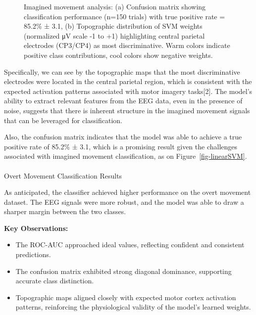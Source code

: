 \documentclass[
  letterpaper,
  DIV=11,
  numbers=noendperiod]{scrartcl}
\makeatletter
\let\oldparagraph\paragraph
\renewcommand{\paragraph}{
    \@ifstar
      \xxxParagraphStar
      \xxxParagraphNoStar
  }
\newcommand{\xxxParagraphStar}[1]{\oldparagraph*{#1}\mbox{}}
\newcommand{\xxxParagraphNoStar}[1]{\oldparagraph{#1}\mbox{}}
\providecommand{\tightlist}{%
  \setlength{\itemsep}{0pt}\setlength{\parskip}{0pt}}\usepackage{longtable,booktabs,array}
\makeatother
\begin{document}
\begin{figure}
{}

\caption{\label{fig-imagined-movement-results}Imagined movement
analysis: (a) Confusion matrix showing classification performance (n=150
trials) with true positive rate = 85.2\% ± 3.1, (b) Topographic
distribution of SVM weights (normalized μV scale -1 to +1) highlighting
central parietal electrodes (CP3/CP4) as most discriminative. Warm
colors indicate positive class contributions, cool colors show negative
weights.}

\end{figure}%

Specifically, we can see by the topographic maps that the most
discriminative electrodes were located in the central parietal region,
which is consistent with the expected activation patterns associated
with motor imagery tasks{[}2{]}. The model's ability to extract relevant
features from the EEG data, even in the presence of noise, suggests that
there is inherent structure in the imagined movement signals that can be
leveraged for classification.

Also, the confusion matrix indicates that the model was able to achieve
a true positive rate of 85.2\% ± 3.1, which is a promising result given
the challenges associated with imagined movement classification, as on
Figure~\ref{fig-linearSVM}.

\paragraph{Overt Movement Classification
Results}\label{overt-movement-classification-results}

As anticipated, the classifier achieved higher performance on the overt
movement dataset. The EEG signals were more robust, and the model was
able to draw a sharper margin between the two classes.

\textbf{Key Observations:}

\begin{itemize}
\tightlist
\item
  The ROC-AUC approached ideal values, reflecting confident and
  consistent predictions.
\item
  The confusion matrix exhibited strong diagonal dominance, supporting
  accurate class distinction.
\item
  Topographic maps aligned closely with expected motor cortex activation
  patterns, reinforcing the physiological validity of the model's
  learned weights.
\end{itemize}
\end{document}
